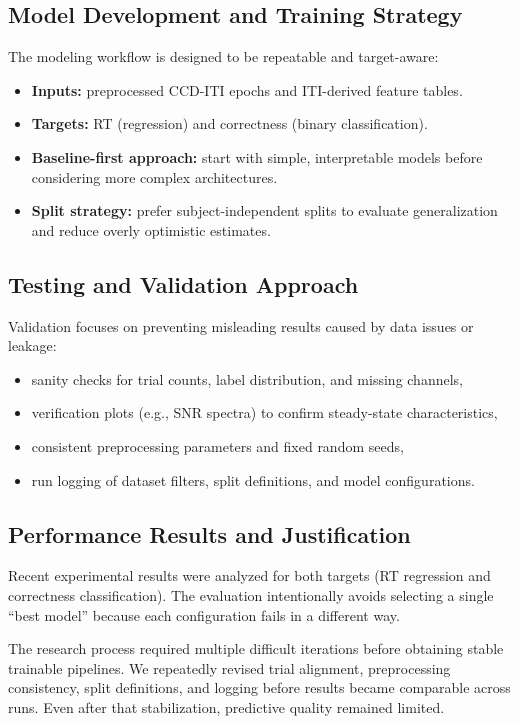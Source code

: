 \subsection{Model Development and Training Strategy}
\label{subsec:model-development-strategy}
The modeling workflow is designed to be repeatable and target-aware:
\begin{itemize}
    \item \textbf{Inputs:} preprocessed CCD-ITI epochs and ITI-derived feature tables.
    \item \textbf{Targets:} RT (regression) and correctness (binary classification).
    \item \textbf{Baseline-first approach:} start with simple, interpretable models before considering more complex architectures.
    \item \textbf{Split strategy:} prefer subject-independent splits to evaluate generalization and reduce overly optimistic estimates.
\end{itemize}

\subsection{Testing and Validation Approach}
\label{subsec:testing-validation}
Validation focuses on preventing misleading results caused by data issues or leakage:
\begin{itemize}
    \item sanity checks for trial counts, label distribution, and missing channels,
    \item verification plots (e.g., SNR spectra) to confirm steady-state characteristics,
    \item consistent preprocessing parameters and fixed random seeds,
    \item run logging of dataset filters, split definitions, and model configurations.
\end{itemize}

\subsection{Performance Results and Justification}
\label{subsec:performance-results}
Recent experimental results were analyzed for both targets (RT regression and correctness classification). The evaluation intentionally avoids selecting a single ``best model'' because each configuration fails in a different way.

The research process required multiple difficult iterations before obtaining stable trainable pipelines. We repeatedly revised trial alignment, preprocessing consistency, split definitions, and logging before results became comparable across runs. Even after that stabilization, predictive quality remained limited.

